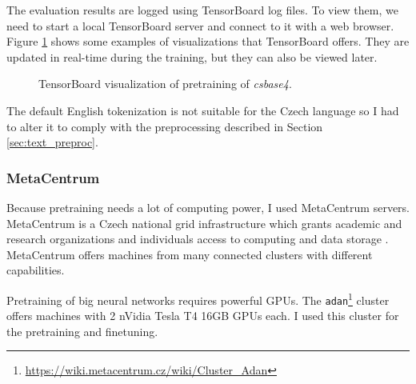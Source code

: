 \documentclass[
  printed, %
  color,   %
  table,   %
  oneside, %
  lof,     %
  lot,     %
]{fithesis3}
\begin{document}
The evaluation results are logged using TensorBoard \parencite{tensorboard} log files. 
To view them, we need to start a local TensorBoard server and connect to it with a web browser. Figure \ref{fig:tb-vis} shows some examples of visualizations that TensorBoard offers. They are updated in real-time during the training, but they can also be viewed later.

\begin{figure}[b!]
    \caption{TensorBoard visualization of pretraining of \textit{csbase4}. }
    \label{fig:tb-vis}
    \centering
\end{figure}

The default English tokenization is not suitable for the Czech language so I had to alter it to comply with the preprocessing described in Section \ref{sec:text_preproc}. 

\subsubsection{MetaCentrum}
Because pretraining needs a lot of computing power, I used MetaCentrum servers. MetaCentrum is a Czech national grid infrastructure which grants academic and research organizations and individuals access to computing and data storage \parencite{metacentrum}. 
MetaCentrum offers machines from many connected clusters with different capabilities.

Pretraining of big neural networks requires powerful GPUs. The \texttt{adan}\footnote{\url{https://wiki.metacentrum.cz/wiki/Cluster_Adan}} cluster offers machines with 2 nVidia Tesla T4 16GB GPUs each. I used this cluster for the pretraining and finetuning.
\end{document}
